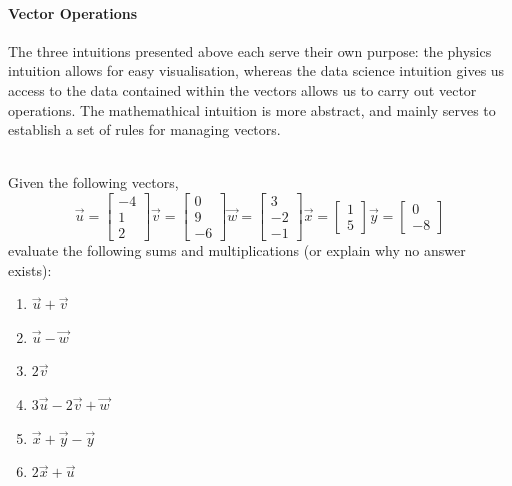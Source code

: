\paragraph{Vector Operations}
The three intuitions presented above each serve their own purpose: the physics intuition allows for easy visualisation, whereas the data science intuition gives us access to the data contained within the vectors allows us to carry out vector operations. The mathemathical intuition is more abstract, and mainly serves to establish a set of rules for managing vectors.

\def\u{\begin{bmatrix} -4 \\ 1 \\ 2 \end{bmatrix}}
\def\v{\begin{bmatrix} 0 \\ 9 \\ -6 \end{bmatrix}}
\def\w{\begin{bmatrix} 3 \\ -2 \\ -1 \end{bmatrix}}
\def\x{\begin{bmatrix} 1 \\ 5 \end{bmatrix}}
\def\y{\begin{bmatrix} 0 \\ -8 \end{bmatrix}}
\def\inprod#1#2{\langle #1 \mid #2 \rangle}
\def\outprod#1#2{\mid\! #1 \rangle \langle #2 \!\mid}

\begin{exercise}\mbox{}\\[2mm]
  Given the following vectors,
  \begin{equation*}
    \vec u = \u
    \vec v = \v
    \vec w = \w
    \vec x = \x
    \vec y = \y
  \end{equation*}
    evaluate the following sums and multiplications (or explain why no answer exists):
    \begin{enumerate}[label=\alph*.]
      \item $\vec u + \vec v$
      \item $\vec u - \vec w$
      \item $2\vec v$
      \item $3\vec u - 2\vec v + \vec w$
      \item $\vec x + \vec y - \vec y$
      \item $2\vec x + \vec u$
    \end{enumerate}
\end{exercise}

